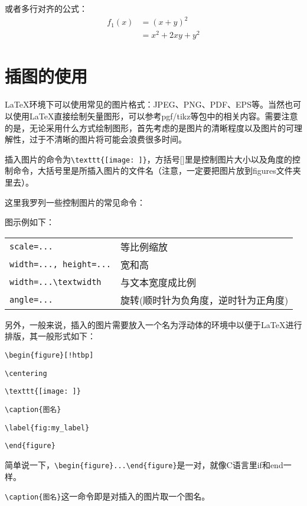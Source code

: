 或者多行对齐的公式：
\begin{equation}
  \begin{aligned}
    f_1(x)&=(x+y)^2\\
          &=x^2+2xy+y^2
  \end{aligned}
\end{equation}

\section{插图的使用}

\LaTeX 环境下可以使用常见的图片格式：JPEG、PNG、PDF、EPS等。当然也可以使用\LaTeX 直接绘制矢量图形，可以参考pgf/tikz等包中的相关内容。需要注意的是，无论采用什么方式绘制图形，首先考虑的是图片的清晰程度以及图片的可理解性，过于不清晰的图片将可能会浪费很多时间。

插入图片的命令为\verb|\texttt{[image: ]}|，方括号[]里是控制图片大小以及角度的控制命令，大括号{}里是所插入图片的文件名（注意，一定要把图片放到figures文件夹里去）。

这里我罗列一些控制图片的常见命令：

图示例如下：

\begin{tabular}{ll}
\verb|scale=...| & 等比例缩放 \\
\verb|width=..., height=...| & 宽和高 \\
\verb|width=...\textwidth| & 与文本宽度成比例\\
\verb|angle=...| & 旋转(顺时针为负角度，逆时针为正角度)\\
\end{tabular}

另外，一般来说，插入的图片需要放入一个名为浮动体的环境中以便于\LaTeX 进行排版，其一般形式如下：

\verb|\begin{figure}[!htbp]|\par
\verb|\centering|\par
\verb|\texttt{[image: ]}|\par
\verb|\caption{图名}|\par
\verb|\label{fig:my_label}|\par
\verb|\end{figure}|

简单说一下，\verb|\begin{figure}...\end{figure}|是一对，就像C语言里if和end一样。

\verb|\caption{图名}|这一命令即是对插入的图片取一个图名。

